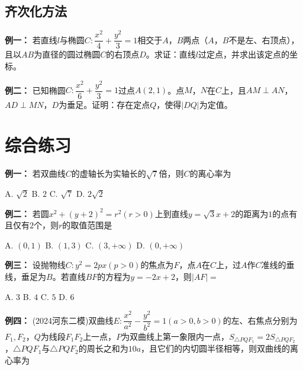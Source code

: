 \documentclass{article}
\begin{document}
\newpage

\subsection{齐次化方法}

\textbf{例一： } 若直线$l$与椭圆$C:\dfrac{x^2}{4}+\dfrac{y^2}{3}=1$相交于$A$，$B$两点（$A$，$B$不是左、右顶点），且以$AB$为直径的圆过椭圆$C$的右顶点$D$。求证：直线$l$过定点，并求出该定点的坐标。

\vspace{18\baselineskip}

\textbf{例二： } 已知椭圆$C:\dfrac{x^2}{6}+\dfrac{y^2}{3}=1$过点$A(2,1)$。点$M$，$N$在$C$上，且$AM \perp AN$，$AD \perp MN$，$D$为垂足。证明：存在定点$Q$，使得$|DQ|$为定值。

\newpage

\section{综合练习}

\noindent\textbf{例一：} 若双曲线$C$的虚轴长为实轴长的$\sqrt{7}$倍，则$C$的离心率为
\vspace{0.5em}

A. $\sqrt{2}$ \quad B. $2$ \quad C. $\sqrt{7}$ \quad D. $2\sqrt{2}$
\vspace{3\baselineskip}

\noindent\textbf{例二：} 若圆$x^2+(y+2)^2=r^2(r>0)$上到直线$y=\sqrt{3}x+2$的距离为$1$的点有且仅有$2$个，则$r$的取值范围是
\vspace{0.5em}

A. $(0,1)$ \quad B. $(1,3)$ \quad C. $(3,+\infty)$ \quad D. $(0,+\infty)$
\vspace{3\baselineskip}

\noindent\textbf{例三：} 设抛物线$C:y^2=2px(p>0)$的焦点为$F$，点$A$在$C$上，过$A$作$C$准线的垂线，垂足为$B$。若直线$BF$的方程为$y=-2x+2$，则$|AF|=$
\vspace{0.5em}

A. $3$ \quad B. $4$ \quad C. $5$ \quad D. $6$
\vspace{3\baselineskip}

\noindent\textbf{例四：} (2024河东二模)双曲线$E:\dfrac{x^2}{a^2}-\dfrac{y^2}{b^2}=1(a>0,b>0)$的左、右焦点分别为$F_1,F_2$，$Q$为线段$F_1F_2$上一点，$P$为双曲线上第一象限内一点，$S_{\triangle PQF_1}=2S_{\triangle PQF_2}$，$\triangle PQF_1$与$\triangle PQF_2$的周长之和为$10a$，且它们的内切圆半径相等，则双曲线的离心率为
\vspace{0.5em}
\end{document}
